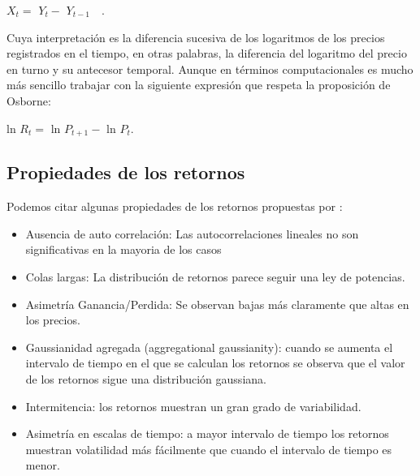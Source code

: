 \begin{center}
$X_t = $ $\mathit{Y_{t}} - $  $\mathit{Y_{t - 1}}$~~.
\end{center}

Cuya interpretación es la diferencia sucesiva de los logaritmos de los precios  registrados en el tiempo, en otras palabras, la diferencia del logaritmo del precio en turno y su antecesor temporal. Aunque en términos computacionales es mucho más sencillo trabajar con la siguiente expresión que respeta la proposición de Osborne\citep[][]{slanina}: 
\begin{center}
ln $R_t = $ ln $\mathit{P_{t+1}} - $ ln $\mathit{P_{t}}$.
\end{center}%


\subsection{Propiedades de los retornos}
\label{retornos}
Podemos citar algunas propiedades de los retornos propuestas por \cite{Cont2001}:

\begin{itemize}
	\item {Ausencia de auto correlación: Las autocorrelaciones lineales no son significativas en la mayoria de los casos}
	\item {Colas largas: La distribución de retornos parece seguir una ley de potencias.}
	\item Asimetría Ganancia/Perdida: Se observan bajas más claramente que altas en los precios. 
	\item Gaussianidad agregada (aggregational gaussianity): cuando se aumenta el intervalo de tiempo en el que se calculan los retornos se observa que el valor de los retornos sigue una distribución gaussiana. 
	\item Intermitencia: los retornos muestran un gran grado de variabilidad.
	\item Asimetría en escalas de tiempo: a mayor intervalo de tiempo los retornos muestran volatilidad más fácilmente que cuando el intervalo de tiempo es menor.
\end{itemize}

